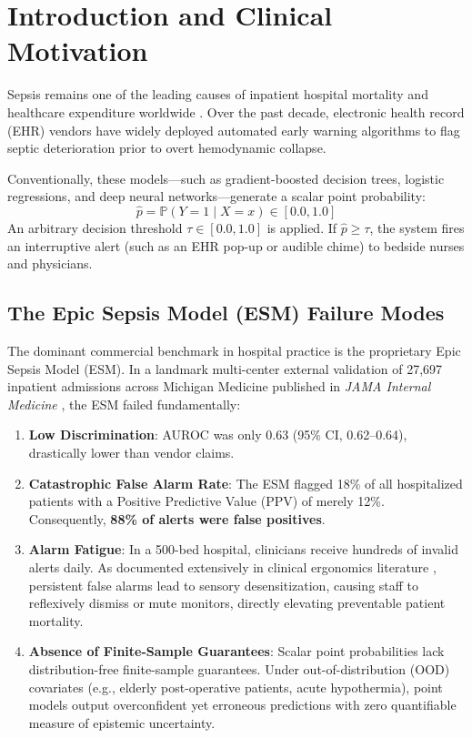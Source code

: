 \documentclass[11pt,a4paper]{article}
\theoremstyle{definition}
\begin{document}
\section{Introduction and Clinical Motivation}

Sepsis remains one of the leading causes of inpatient hospital mortality and healthcare expenditure worldwide \cite{wong2021external,singer2016third}. Over the past decade, electronic health record (EHR) vendors have widely deployed automated early warning algorithms to flag septic deterioration prior to overt hemodynamic collapse.

Conventionally, these models—such as gradient-boosted decision trees, logistic regressions, and deep neural networks—generate a scalar point probability:
\begin{equation}
\hat{p} = \mathbb{P}(Y = 1 \mid X = x) \in [0.0, 1.0]
\end{equation}
An arbitrary decision threshold $\tau \in [0.0, 1.0]$ is applied. If $\hat{p} \ge \tau$, the system fires an interruptive alert (such as an EHR pop-up or audible chime) to bedside nurses and physicians.

\subsection{The Epic Sepsis Model (ESM) Failure Modes}
The dominant commercial benchmark in hospital practice is the proprietary Epic Sepsis Model (ESM). In a landmark multi-center external validation of 27,697 inpatient admissions across Michigan Medicine published in \textit{JAMA Internal Medicine} \cite{wong2021external}, the ESM failed fundamentally:
\begin{enumerate}
    \item \textbf{Low Discrimination}: AUROC was only $0.63$ (95\% CI, 0.62–0.64), drastically lower than vendor claims.
    \item \textbf{Catastrophic False Alarm Rate}: The ESM flagged 18\% of all hospitalized patients with a Positive Predictive Value (PPV) of merely 12\%. Consequently, \textbf{88\% of alerts were false positives}.
    \item \textbf{Alarm Fatigue}: In a 500-bed hospital, clinicians receive hundreds of invalid alerts daily. As documented extensively in clinical ergonomics literature \cite{sendelbach2013alarm}, persistent false alarms lead to sensory desensitization, causing staff to reflexively dismiss or mute monitors, directly elevating preventable patient mortality.
    \item \textbf{Absence of Finite-Sample Guarantees}: Scalar point probabilities lack distribution-free finite-sample guarantees. Under out-of-distribution (OOD) covariates (e.g., elderly post-operative patients, acute hypothermia), point models output overconfident yet erroneous predictions with zero quantifiable measure of epistemic uncertainty.
\end{enumerate}
\end{document}
